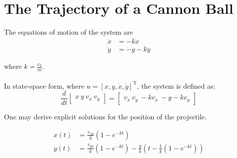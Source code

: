 \section{The Trajectory of a Cannon Ball}

The equations of motion of the system are 
\begin{align}
\ddot{x} &= -k \dot{x} \\
\ddot{y} &= -g - k \dot{y}
\end{align}

where $k = \frac{c_d}{m}$.\\
\\

In state-space form, where $u=[x,y,\dot{x},\dot{y}]^\text{T}$, the system is defined as:
\begin{equation}
\frac{d}{dt} \begin{bmatrix} x \ y \ v_x \ v_y \end{bmatrix} = \begin{bmatrix} v_x \ v_y \ -k v_x \ -g - k v_y \end{bmatrix}
\end{equation}

One may derive explicit solutions for the position of the projectile.

\begin{align}
x(t) &= \frac{v_{x0}}{k} \left( 1 - e^{-kt} \right) \\
y(t) &= \frac{v_{y0}}{k} \left( 1 - e^{-kt} \right) - \frac{g}{k} \left( t - \frac{1}{k}(1 - e^{-kt}) \right)
\end{align}

